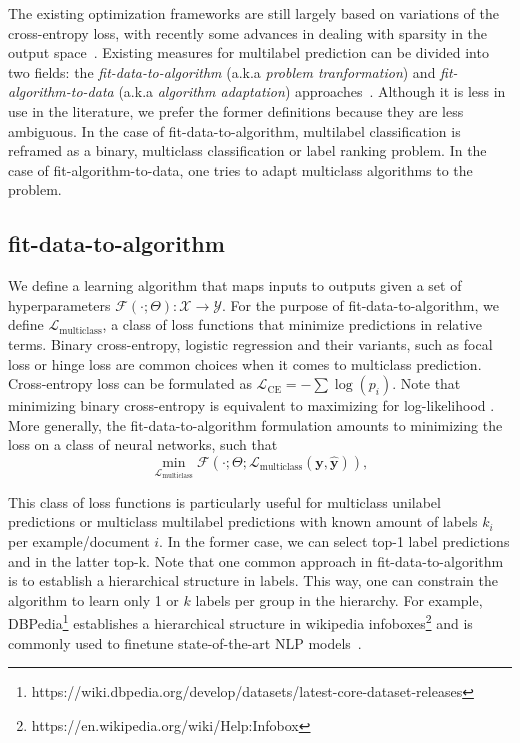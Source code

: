The existing optimization frameworks are still largely based on variations of
the cross-entropy loss, with recently some advances in dealing with
sparsity in the output space~\citep[see, e.g.,][]{focalLoss,tencent}. Existing measures for multilabel prediction can be
divided into two fields: the \emph{fit-data-to-algorithm} (a.k.a \emph{problem tranformation}) and \emph{fit-algorithm-to-data} (a.k.a \emph{algorithm adaptation}) approaches~\cite{multilabelReview}. Although it is less in use in the literature, we prefer the former definitions because they are less ambiguous. In the case of fit-data-to-algorithm,
multilabel classification is reframed as a binary, multiclass classification
or label ranking problem. In the case of fit-algorithm-to-data, one tries to
adapt multiclass algorithms to the problem.

\subsection{fit-data-to-algorithm} We define a learning algorithm that maps inputs to outputs given a set of hyperparameters \(\mathcal{F}(\cdot ; \Theta): \mathcal{X} \rightarrow \mathcal{Y}\). For the purpose of fit-data-to-algorithm,
we define \(\mathcal{L}_{\text {multiclass}}\), a class of loss functions that
minimize predictions in relative terms. Binary cross-entropy, logistic regression and their
variants, such as focal loss or hinge loss are common choices when it comes to
multiclass prediction. Cross-entropy loss can be formulated as
\(\mathcal{L}_{\text {CE}}=-\sum \log \left(p_{i}\right)\). Note that
minimizing binary cross-entropy is equivalent to maximizing for log-likelihood
\cite[Section 4.3.4]{Bishop}. More generally, the fit-data-to-algorithm formulation amounts to minimizing the loss on a class of neural networks, such that
%
\begin{equation}
\underset{\mathcal{L}_{\text {multiclass}}} {\min} \mathcal{F}\left(\cdot ;
\Theta; \mathcal{L}_{\text {multiclass}} (\mathbf{y}, \hat{\mathbf{y}})
\right),
\end{equation}
%

This class of loss functions is particularly useful for multiclass unilabel predictions or multiclass multilabel predictions with known amount of labels $k_i$ per example/document $i$. In the former case,  we can select top-1 label predictions and in the latter top-k. Note that one common approach in fit-data-to-algorithm is to establish a hierarchical structure in labels. This way, one can constrain the algorithm to learn only 1 or $k$ labels per group in the hierarchy. For example, DBPedia\footnote{https://wiki.dbpedia.org/develop/datasets/latest-core-dataset-releases} establishes a hierarchical structure in wikipedia infoboxes\footnote{https://en.wikipedia.org/wiki/Help:Infobox} and is commonly used to finetune state-of-the-art NLP models~\citep[see, e.g.,][]{XLNet, ULMFit}.


